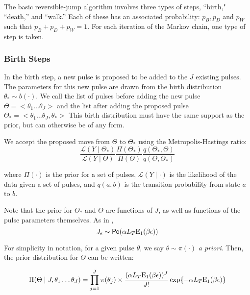 \documentclass[12pt,letterpaper]{article}
\begin{document}
    The basic reversible-jump algorithm involves three types of steps, ``birth," ``death,'' and ``walk.'' Each of these has an associated probability: $p_B, p_D$ and $p_W$ such that $p_B + p_D + p_W = 1$.  For each iteration of the Markov chain, one type of step is taken. 

    \subsubsection{Birth Steps}

    In the birth step, a new pulse is proposed to be added to the $J$ existing pulses. The parameters for this new pulse are drawn from the birth distribution $ \theta_* \sim b(\cdot)$.  We call the list of pulses before adding the new pulse $\Theta = <\theta_1 \dots \theta_J>$  and the list after adding the proposed pulse $\Theta_* =   <\theta_1 \dots \theta_J, \theta_*>$  This birth distribution must have the same support as the prior, but can otherwise be of any form. 

    We accept the proposed move from $\Theta$ to $\Theta_*$ using the Metropolis-Hastings ratio:
    \begin{equation}
 \frac{\mathcal{L}(Y \mid \Theta_* )}{\mathcal{L}(Y \mid \Theta )} \frac{\Pi(\Theta_*)}{\Pi(\Theta)} 
       \frac{q(\Theta_*, \Theta)}{q(\Theta, \Theta_*)}     
    \end{equation}

     where $\Pi(\cdot)$ is the prior for a set of pulses, $\mathcal{L}(Y \mid \cdot)$ is the likelihood of the data given a set of pulses, and $q(a,b)$ is the transition probability from state $a$ to $b$. 

    Note that the prior for $\Theta_*$ and $\Theta$ are functions of $J$, as well as functions of the pulse parameters themselves. As in , 
     \begin{equation}
J_\epsilon \sim \mathsf{Po}(\alpha L_T  {\mathrm{E}_1}(\beta \epsilon) )      
     \end{equation}

    For simplicity in notation, for a given pulse $\theta$, we say $\theta \sim \pi(\cdot)$ \emph{a priori}. 
    Then, the prior distribution for $\Theta$ can be written:
    
    \begin{equation}
  \Pi(\Theta \mid J, \theta_1 \dots \theta_J) = \prod_{j = 1}^J \pi(\theta_j) \times \frac{(\alpha L_T  {\mathrm{E}_1}(\beta \epsilon) )^J}{J!} \exp\{-\alpha L_T  {\mathrm{E}_1}(\beta \epsilon)\}    
    \end{equation}
\end{document}
